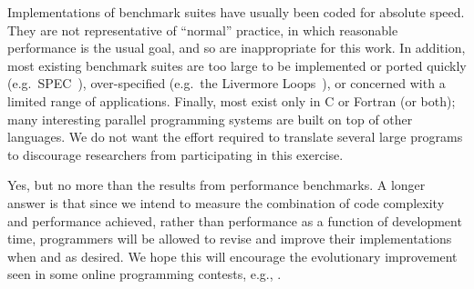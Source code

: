 
Implementations of benchmark suites have usually been coded for absolute speed.
They are not representative of ``normal'' practice,
in which reasonable performance is the usual goal,
and so are inappropriate for this work.
In addition,
most existing benchmark suites are too large to be implemented or ported quickly
(e.g.\ SPEC~\cite{b:bench-over}),
over-specified (e.g.\ the Livermore Loops~\cite{b:livermore-loops}),
or concerned with a limited range of applications.
Finally,
most exist only in C or Fortran (or both);
many interesting parallel programming systems are built on top of other languages.
We do not want the effort required to translate several large programs
to discourage researchers from participating in this exercise.


Yes,
but no more than the results from performance benchmarks.
A longer answer is that
since we intend to measure the combination of code complexity and performance achieved,
rather than performance as a function of development time,
programmers will be allowed to revise and improve their implementations when and as desired.
We hope this will encourage the evolutionary improvement seen in some online programming contests,
e.g., \cite{b:gulley-contest}.
